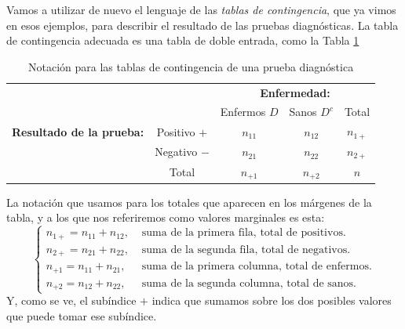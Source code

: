 Vamos a utilizar de nuevo el lenguaje de las {\em tablas de contingencia}, que ya vimos en esos ejemplos, para describir el resultado de las pruebas diagnósticas. La tabla de contingencia adecuada es una tabla de doble entrada, como la Tabla \ref{cap03:tabla:notacionTablaContingencia}

\begin{table}[ht]
        \begin{center}
        \begin{tabular}{cc|c|c|c|}
              &\multicolumn{1}{c}{}&\multicolumn{3}{c}{\bf Enfermedad:}\\
              \cline{3-5}
               &\multicolumn{1}{c|}{}& Enfermos $D$&  Sanos $D^c$& Total \\
               \cline{2-5}
        {\bf Resultado de la prueba:}&\multicolumn{1}{|c|}{Positivo $+$}& $n_{11}$ & $n_{12}$ & $n_{1+}$ \\ %
              \cline{2-5}
             & \multicolumn{1}{|c|}{Negativo $-$}& $n_{21}$ & $n_{22}$ &  $n_{2+}$\\ %
              \cline{2-5}
             & \multicolumn{1}{|c|}{Total} & $n_{+1}$ & $n_{+2}$ & $n$ \\
              \cline{2-5}
        \end{tabular}
        \end{center}
\caption{Notación para las tablas de contingencia de una prueba diagnóstica}
\label{cap03:tabla:notacionTablaContingencia}
\end{table}
La notación que usamos para los totales que aparecen en los márgenes de la tabla, y a los que nos referiremos como {\sf valores marginales} es esta:
\[
\begin{cases}
n_{1+}=n_{11}+n_{12},&\mbox{ suma de la primera fila, total de positivos}.\\[2mm]
n_{2+}=n_{21}+n_{22},&\mbox{ suma de la segunda fila, total de negativos}.\\[5mm]
n_{+1}=n_{11}+n_{21},&\mbox{ suma de la primera columna, total de enfermos}.\\[2mm]
n_{+2}=n_{12}+n_{22},&\mbox{ suma de la segunda columna, total de sanos}.
\end{cases}
\]
Y, como se ve, el subíndice $+$ indica que sumamos sobre los dos posibles valores que puede tomar ese subíndice.

